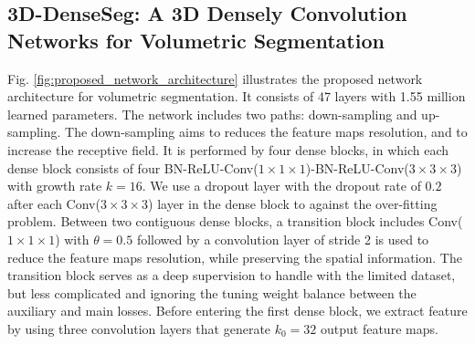 \documentclass{llncs}
\begin{document}
\subsection{3D-DenseSeg: A 3D Densely Convolution Networks for Volumetric Segmentation}
Fig. \ref{fig:proposed_network_architecture} illustrates the proposed network architecture for volumetric segmentation. It consists of 47 layers with 1.55 million learned parameters. The network includes two paths: down-sampling and up-sampling. The down-sampling aims to reduces the feature maps resolution, and to increase the receptive field. It is performed by four dense blocks, in which each dense block consists of four BN-ReLU-Conv($1\times1\times1$)-BN-ReLU-Conv($3\times3\times3$) with growth rate $k=16$. We use a dropout layer \cite{srivastava2014dropout} with the dropout rate of $0.2$ after each Conv($3\times3\times3$) layer in the dense block to against the over-fitting problem. Between two contiguous dense blocks,  a transition block includes Conv($1\times1\times1$) with $\theta=0.5$ followed by a convolution layer of stride 2 is used to reduce the feature maps resolution, while preserving the spatial information. The transition block serves as a deep supervision to handle with the limited dataset, but less complicated and ignoring the tuning weight balance between the auxiliary and main losses. Before entering the first dense block, we extract feature by using three convolution layers that generate $k_0=32$ output feature maps.
\end{document}

